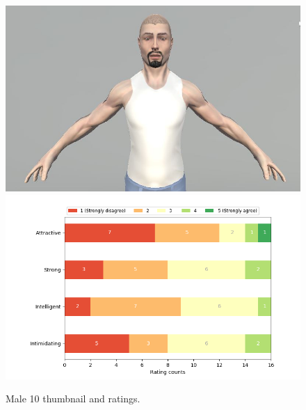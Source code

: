 \begin{figure}[H]
  \includegraphics[width=\linewidth]{Images/Males/10.JPG}
\endminipage\hfill
{}
  \includegraphics[width=\linewidth]{Survey/MRatings/avatar_m10.png}
\endminipage\hfill
\caption{Male 10 thumbnail and ratings.}
\end{figure}

